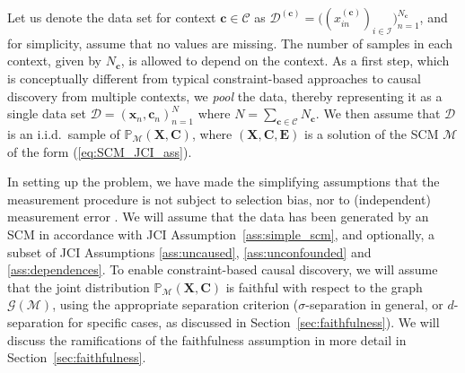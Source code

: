\documentclass[twoside,11pt]{article}
\newcommand{\Prb}{\mathbb{P}}
\newcommand\B[1]{\bm{#1}}
\newcommand\C[1]{\mathcal{#1}}
\newcommand\BC[1]{\bm{\mathcal{#1}}}
\newcommand\given{\,|\,}
\newcommand\eref[1]{(\ref{#1})}
\newcommand{\Joris}[1]{{\color{blue}#1}}
\newcommand{\Tom}[1] {{\color{green}#1}}
\begin{document}
Let us denote the data set for context $\B{c} \in \BC{C}$ as
$\C{D}^{(\B{c})} = \big((x_{in}^{(\B{c})})_{i\in\C{I}}\big)_{n=1}^{N_{\B{c}}}$, and for simplicity, assume that no values are missing.
The number of samples in each context, given by $N_{\B{c}}$, is allowed to depend on the context. 
As a first step, which is conceptually different from typical constraint-based approaches to
causal discovery from multiple contexts, we \emph{pool} the data, thereby representing it as a single data set $\C{D} = (\B{x}_n,\B{c}_n)_{n=1}^N$ where $N = \sum_{\B{c}\in\BC{C}} N_{\B{c}}$. We then assume that $\C{D}$ is an i.i.d.\ sample of $\Prb_{\C{M}}(\B{X},\B{C})$, where $(\B{X},\B{C},\B{E})$ is a solution of the SCM $\C{M}$ of the form \eref{eq:SCM_JCI_ass}. 

In setting up the problem, we have made the simplifying assumptions that the measurement procedure is not subject to selection 
bias, nor to (independent) measurement error \citep{Blom++_UAI_18}.
We will assume that the data has been generated by an SCM in accordance with JCI Assumption~\ref{ass:simple_scm}, and optionally, a subset of JCI Assumptions \ref{ass:uncaused}, \ref{ass:unconfounded} and \ref{ass:dependences}.
To enable constraint-based causal discovery, we will assume that the joint distribution $\Prb_{\C{M}}(\B{X},\B{C})$ is faithful with respect to the graph $\C{G}(\C{M})$, using the appropriate separation criterion ($\sigma$-separation in general, or $d$-separation for specific cases, as discussed in Section~\ref{sec:faithfulness}). We will discuss the ramifications of the faithfulness assumption in more detail in Section~\ref{sec:faithfulness}. 
\end{document}
